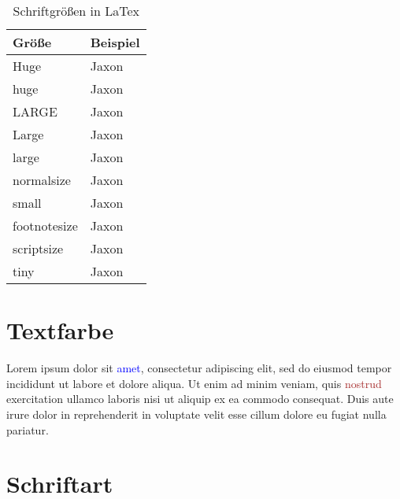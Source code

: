 \documentclass[12pt, a4paper]{article} %
\begin{document}
\begin{table}[h] 
\centering
\begin{tabular}{l | l}
\bf{Gr\"o\ss e} & \bf{Beispiel} \\
\hline 
Huge & \Huge Jaxon\\
\hline
huge & \huge Jaxon\\
\hline
LARGE & \LARGE Jaxon\\
\hline
Large & \Large Jaxon\\
\hline 
large & \large Jaxon\\
\hline
normalsize & \normalsize Jaxon\\
\hline
small & \small Jaxon\\
\hline
footnotesize & \footnotesize Jaxon\\
\hline
scriptsize & \scriptsize Jaxon\\
\hline
tiny & \tiny Jaxon\\
\end{tabular}
\caption{\label{tab4}Schriftgr\"o\ss en in LaTex }
\end{table}

\section{Textfarbe}


Lorem ipsum dolor sit \textcolor{blue}{amet}, consectetur adipiscing elit, sed do eiusmod tempor incididunt ut labore et dolore  aliqua. Ut enim ad minim veniam, quis \colorbox{myrice}{\textcolor{brown}{nostrud}} exercitation ullamco laboris nisi ut aliquip ex ea commodo consequat. Duis aute irure dolor in reprehenderit in voluptate velit esse cillum dolore eu fugiat nulla pariatur.

\section{Schriftart}


\end{document}
